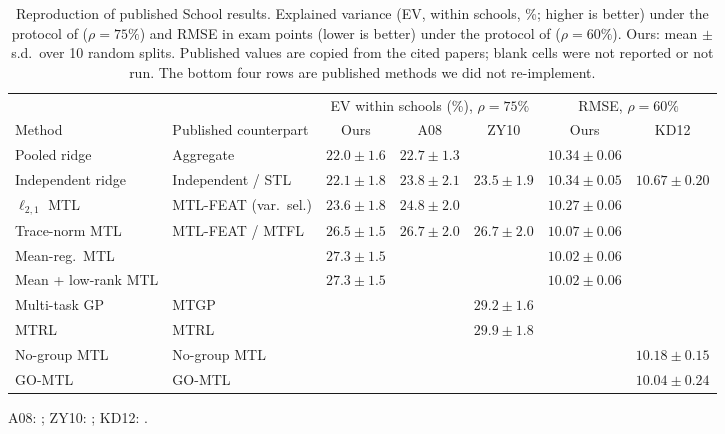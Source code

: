 \begin{table}[t]
\centering
\caption{Reproduction of published School results. Explained variance (EV, within schools, \%; higher is better) under the protocol of \citet{argyriou2008convex} ($\rho = 75\%$) and RMSE in exam points (lower is better) under the protocol of \citet{kumar2012learning} ($\rho = 60\%$). Ours: mean $\pm$ s.d.\ over 10 random splits. Published values are copied from the cited papers; blank cells were not reported or not run. The bottom four rows are published methods we did not re-implement.}
\label{tab:repro}
\small
\setlength{\tabcolsep}{2.7pt}
\begin{tabular}{@{}llccccc@{}}
\toprule
& & \multicolumn{3}{c}{EV within schools (\%), $\rho = 75\%$} & \multicolumn{2}{c}{RMSE, $\rho = 60\%$} \\
\cmidrule(lr){3-5}\cmidrule(l){6-7}
Method & Published counterpart & Ours & A08 & ZY10 & Ours & KD12 \\
\midrule
Pooled ridge & Aggregate & $22.0 \pm 1.6$ & $22.7 \pm 1.3$ &  & $10.34 \pm 0.06$ &  \\
Independent ridge & Independent / STL & $22.1 \pm 1.8$ & $23.8 \pm 2.1$ & $23.5 \pm 1.9$ & $10.34 \pm 0.05$ & $10.67 \pm 0.20$ \\
$\ell_{2,1}$ MTL & MTL-FEAT (var.\ sel.) & $23.6 \pm 1.8$ & $24.8 \pm 2.0$ &  & $10.27 \pm 0.06$ &  \\
Trace-norm MTL & MTL-FEAT / MTFL & $26.5 \pm 1.5$ & $26.7 \pm 2.0$ & $26.7 \pm 2.0$ & $10.07 \pm 0.06$ &  \\
Mean-reg.\ MTL &  & $27.3 \pm 1.5$ &  &  & $10.02 \pm 0.06$ &  \\
Mean + low-rank MTL &  & $27.3 \pm 1.5$ &  &  & $10.02 \pm 0.06$ &  \\
\midrule
Multi-task GP & MTGP & & & $29.2 \pm 1.6$ & & \\
MTRL & MTRL & & & $29.9 \pm 1.8$ & & \\
No-group MTL & No-group MTL & & & & & $10.18 \pm 0.15$ \\
GO-MTL & GO-MTL & & & & & $10.04 \pm 0.24$ \\
\bottomrule
\end{tabular}

\vspace{2pt}
{\footnotesize A08: \citet{argyriou2008convex}; ZY10: \citet{zhang2010convex}; KD12: \citet{kumar2012learning}.}
\end{table}
